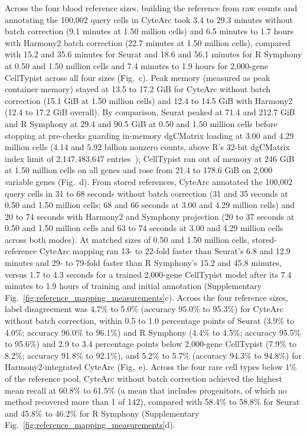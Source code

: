 Across the four blood reference sizes, building the reference from raw counts and annotating the 100,002 query cells in CyteArc took 3.4 to 29.3 minutes without batch correction (9.1 minutes at 1.50 million cells) and 6.5 minutes to 1.7 hours with Harmony2 batch correction (22.7 minutes at 1.50 million cells), compared with 15.2 and 35.6 minutes for Seurat and 18.6 and 56.1 minutes for R Symphony at 0.50 and 1.50 million cells and 7.4 minutes to 1.9 hours for 2,000-gene CellTypist across all four sizes (Fig.~c). Peak memory (measured as peak container memory) stayed at 13.5 to 17.2 GiB for CyteArc without batch correction (15.1 GiB at 1.50 million cells) and 12.4 to 14.5 GiB with Harmony2 (12.4 to 17.2 GiB overall). By comparison, Seurat peaked at 71.4 and 212.7 GiB and R Symphony at 29.4 and 90.5 GiB at 0.50 and 1.50 million cells before stopping at pre-checks guarding in-memory dgCMatrix loading at 3.00 and 4.29 million cells (4.14 and 5.92 billion nonzero counts, above R's 32-bit dgCMatrix index limit of 2,147,483,647 entries~\cite{parks2025bpcells}); CellTypist ran out of memory at 246 GiB at 1.50 million cells on all genes and rose from 21.4 to 178.6 GiB on 2,000 variable genes (Fig.~d). From stored references, CyteArc annotated the 100,002 query cells in 31 to 68 seconds without batch correction (31 and 35 seconds at 0.50 and 1.50 million cells; 68 and 66 seconds at 3.00 and 4.29 million cells) and 20 to 74 seconds with Harmony2 and Symphony projection (20 to 37 seconds at 0.50 and 1.50 million cells and 63 to 74 seconds at 3.00 and 4.29 million cells across both modes). At matched sizes of 0.50 and 1.50 million cells, stored-reference CyteArc mapping ran 13- to 22-fold faster than Seurat's 6.8 and 12.9 minutes and 29- to 79-fold faster than R Symphony's 15.2 and 45.8 minutes, versus 1.7 to 4.3 seconds for a trained 2,000-gene CellTypist model after its 7.4 minutes to 1.9 hours of training and initial annotation (Supplementary Fig.~\ref{fig:reference_mapping_measurements}c). Across the four reference sizes, label disagreement was 4.7\% to 5.0\% (accuracy 95.0\% to 95.3\%) for CyteArc without batch correction, within 0.5 to 1.0 percentage points of Seurat (3.9\% to 4.0\%; accuracy 96.0\% to 96.1\%) and R Symphony (4.4\% to 4.5\%; accuracy 95.5\% to 95.6\%) and 2.9 to 3.4 percentage points below 2,000-gene CellTypist (7.9\% to 8.2\%; accuracy 91.8\% to 92.1\%), and 5.2\% to 5.7\% (accuracy 94.3\% to 94.8\%) for Harmony2-integrated CyteArc (Fig.~e). Across the four rare cell types below 1\% of the reference pool, CyteArc without batch correction achieved the highest mean recall at 60.8\% to 61.5\% (a mean that includes progenitors, of which no method recovered more than 1 of 142), compared with 58.4\% to 58.8\% for Seurat and 45.8\% to 46.2\% for R Symphony (Supplementary Fig.~\ref{fig:reference_mapping_measurements}d).

